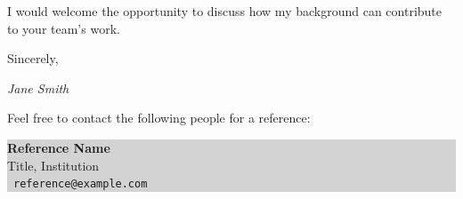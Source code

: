 \documentclass[12pt,a4paper]{article}
\begin{document}
I would welcome the opportunity to discuss how my background can contribute to your team's work.

\vspace{0.8cm}

Sincerely,

\vspace{0.5cm}

{\color{primary}\textit{Jane Smith}}

\vspace{1cm}

{\small\color{secondary}Feel free to contact the following people for a reference:}

\vspace{0.4cm}

\noindent\begin{minipage}[t]{0.48\textwidth}
    \colorbox{lightgray}{%
        \parbox{\dimexpr\textwidth-2\fboxsep}{%
            \small
            \textbf{\color{primary}Reference Name}\\
            Title, Institution\\[0.2cm]
            \faEnvelope\ \texttt{reference@example.com}
        }%
    }
\end{minipage}
\end{document}
